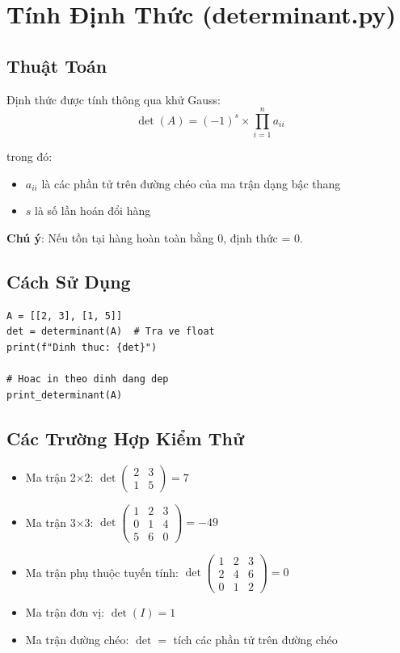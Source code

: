 \documentclass[12pt, a4paper, twoside]{article}
\begin{document}
\section{Tính Định Thức (determinant.py)}

\subsection{Thuật Toán}

Định thức được tính thông qua khử Gauss:
\[
\det(A) = (-1)^{s} \times \prod_{i=1}^{n} a_{ii}
\]

trong đó:
\begin{itemize}
    \item $a_{ii}$ là các phần tử trên đường chéo của ma trận dạng bậc thang
    \item $s$ là số lần hoán đổi hàng
\end{itemize}

\textbf{Chú ý}: Nếu tồn tại hàng hoàn toàn bằng 0, định thức = 0.

\subsection{Cách Sử Dụng}

\begin{lstlisting}
A = [[2, 3], [1, 5]]
det = determinant(A)  # Tra ve float
print(f"Dinh thuc: {det}")

# Hoac in theo dinh dang dep
print_determinant(A)
\end{lstlisting}

\subsection{Các Trường Hợp Kiểm Thử}

\begin{itemize}
    \item Ma trận 2×2: $\det\begin{pmatrix} 2 & 3 \\ 1 & 5 \end{pmatrix} = 7$
    
    \item Ma trận 3×3: $\det\begin{pmatrix} 1 & 2 & 3 \\ 0 & 1 & 4 \\ 5 & 6 & 0 \end{pmatrix} = -49$
    
    \item Ma trận phụ thuộc tuyến tính: $\det\begin{pmatrix} 1 & 2 & 3 \\ 2 & 4 & 6 \\ 0 & 1 & 2 \end{pmatrix} = 0$
    
    \item Ma trận đơn vị: $\det(I) = 1$
    
    \item Ma trận đường chéo: $\det = $ tích các phần tử trên đường chéo
\end{itemize}
\end{document}
